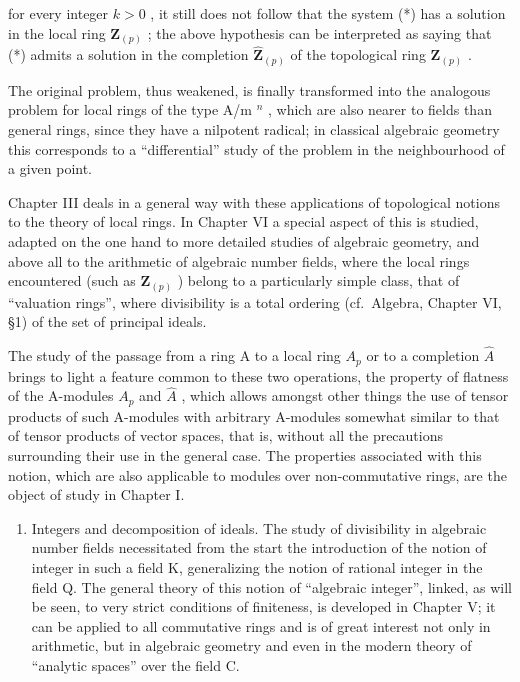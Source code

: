 for every integer \(k > 0\) , it still does not follow that the system (*) has a solution in the local ring \(\mathbf{Z}_{(p)}\) ; the above hypothesis can be interpreted as saying that (*) admits a solution in the completion \(\hat{\mathbf{Z}}_{(p)}\) of the topological ring \(\mathbf{Z}_{(p)}\) .

The original problem, thus weakened, is finally transformed into the analogous problem for local rings of the type A/m \(^{n}\) , which are also nearer to fields
than general rings, since they have a nilpotent radical; in classical algebraic geometry this corresponds to a ``differential'' study of the problem in the neighbourhood of a given point.

Chapter III deals in a general way with these applications of topological notions to the theory of local rings. In Chapter VI a special aspect of this is studied, adapted on the one hand to more detailed studies of algebraic geometry, and above all to the arithmetic of algebraic number fields, where the local rings encountered (such as \(\mathbf{Z}_{(p)}\) ) belong to a particularly simple class, that of ``valuation rings'', where divisibility is a total ordering (cf.~Algebra, Chapter VI, §1) of the set of principal ideals.

The study of the passage from a ring A to a local ring \(A_{p}\) or to a completion \(\hat{A}\) brings to light a feature common to these two operations, the property of flatness of the A-modules \(A_{p}\) and \(\hat{A}\) , which allows amongst other things the use of tensor products of such A-modules with arbitrary A-modules somewhat similar to that of tensor products of vector spaces, that is, without all the precautions surrounding their use in the general case. The properties associated with this notion, which are also applicable to modules over non-commutative rings, are the object of study in Chapter I.

\begin{enumerate}
\def\labelenumi{\Roman{enumi}.}
\setcounter{enumi}{2}
\tightlist
\item
  Integers and decomposition of ideals. The study of divisibility in algebraic number fields necessitated from the start the introduction of the notion of integer in such a field K, generalizing the notion of rational integer in the field Q. The general theory of this notion of ``algebraic integer'', linked, as will be seen, to very strict conditions of finiteness, is developed in Chapter V; it can be applied to all commutative rings and is of great interest not only in arithmetic, but in algebraic geometry and even in the modern theory of ``analytic spaces'' over the field C.
\end{enumerate}

